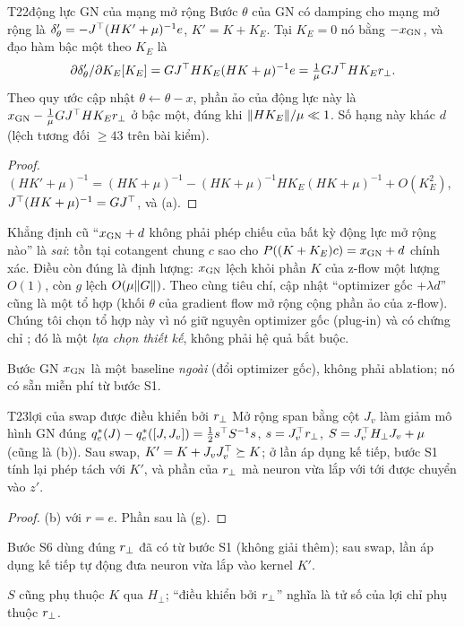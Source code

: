 \begin{namedthm}{T22}{động lực GN của mạng mở rộng}
Bước $\theta$ của GN có damping cho mạng mở rộng là $\delta'_\theta=-J^{\top}(HK'+\mu)^{-1}e$, $K'=K+K_E$. Tại $K_E=0$ nó bằng $-x_{\mathrm{GN}}$, và đạo hàm bậc một theo $K_E$ là
\[
\partial\delta'_\theta/\partial K_E[K_E]=GJ^{\top} HK_E(HK+\mu)^{-1}e=\tfrac1\mu GJ^{\top} HK_Er_{\perp} .
\]
Theo quy ước cập nhật $\theta\leftarrow\theta-x$, phần ảo của động lực này là $x_{\mathrm{GN}}-\tfrac1\mu GJ^{\top} HK_Er_{\perp}$ ở bậc một, đúng khi $\lVert HK_E\rVert/\mu\ll1$. Số hạng này khác $d$ (lệch tương đối $\ge43$ trên bài kiểm).
\end{namedthm}
\begin{proof}
$(HK'+\mu)^{-1}=(HK+\mu)^{-1}-(HK+\mu)^{-1}HK_E(HK+\mu)^{-1}+O(K_E^2)$, $J^{\top}(HK+\mu)^{-1}=GJ^{\top}$, và (a).
\end{proof}
\begin{remark}
Khẳng định cũ ``$x_{\mathrm{GN}}+d$ không phải phép chiếu của bất kỳ động lực mở rộng nào'' là \emph{sai}: tồn tại cotangent chung $c$ sao cho $P((K+K_E)c)=x_{\mathrm{GN}}+d$ chính xác. Điều còn đúng là định lượng: $x_{\mathrm{GN}}$ lệch khỏi phần $K$ của z-flow một lượng $O(1)$, còn $g$ lệch $O(\mu\lVert G\rVert)$. Theo cùng tiêu chí, cập nhật ``optimizer gốc $+\lambda d$'' cũng là một tổ hợp (khối $\theta$ của gradient flow mở rộng cộng phần ảo của z-flow). Chúng tôi chọn tổ hợp này vì nó giữ nguyên optimizer gốc (plug-in) và có chứng chỉ ; đó là một \emph{lựa chọn thiết kế}, không phải hệ quả bắt buộc.
\end{remark}
\begin{hequa}
Bước GN $x_{\mathrm{GN}}$ là một baseline \emph{ngoài} (đổi optimizer gốc), không phải ablation; nó có sẵn miễn phí từ bước S1.
\end{hequa}

\begin{namedthm}{T23}{lợi của swap được điều khiển bởi $r_{\perp}$}
Mở rộng span bằng cột $J_v$ làm giảm mô hình GN đúng $q^*_e(J)-q^*_e([J,J_v])=\tfrac12s^{\top} S^{-1}s$, $s=J_v^{\top}r_{\perp}$, $S=J_v^{\top} H_\perp J_v+\mu$ (cũng là (b)). Sau swap, $K'=K+J_vJ_v^{\top}\succeq K$; ở lần áp dụng kế tiếp, bước S1 tính lại phép tách với $K'$, và phần của $r_{\perp}$ mà neuron vừa lắp với tới được chuyển vào $z'$.
\end{namedthm}
\begin{proof}
(b) với $r=e$. Phần sau là (g).
\end{proof}
\begin{hequa}
Bước S6 dùng đúng $r_{\perp}$ đã có từ bước S1 (không giải thêm); sau swap, lần áp dụng kế tiếp tự động đưa neuron vừa lắp vào kernel $K'$.
\end{hequa}
\begin{remark}
$S$ cũng phụ thuộc $K$ qua $H_\perp$; ``điều khiển bởi $r_{\perp}$'' nghĩa là tử số của lợi chỉ phụ thuộc $r_{\perp}$.
\end{remark}

